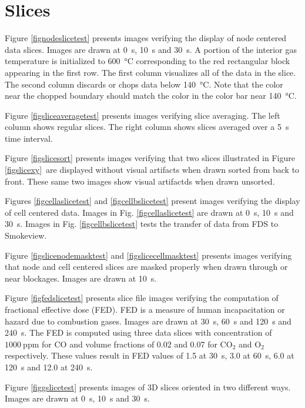 \documentclass[11pt,twoside]{book}
\begin{document}
\clearpage

\section{Slices}
Figure \ref{fignodeslicetest} presents images verifying the display of node centered data slices.
Images are drawn at \SI{0}{s}, \SI{10}{s} and \SI{30}{s}. A portion of the interior
gas temperature is initialized to \SI{600}{\degreeCelsius} corresponding to the
red rectangular block appearing in the first row. The first column visualizes
all of the data in the slice.  The second column discards or chops data below
\SI{140}{\degreeCelsius}. Note that the color near the chopped boundary should
match the color in the color bar near \SI{140}{\degreeCelsius}.

Figure \ref{figsliceaveragetest} presents images verifying slice averaging.  The left column shows regular slices.  The right column
shows slices averaged over a 5~s time interval.

Figure \ref{figslicesort} presents images verifying that two slices
illustrated in Figure \ref{figslicexy}\
are displayed without visual artifacts when drawn sorted from back to front.
These same two images show visual artifactds when drawn unsorted.

Figures \ref{figcellaslicetest} and \ref{figcellbslicetest} present images
verifying the display of cell centered data. Images in Fig. \ref{figcellaslicetest}
are drawn at \SI{0}{s}, \SI{10}{s} and \SI{30}{s}. Images in
Fig. \ref{figcellbslicetest} tests the transfer of data from FDS to Smokeview.

Figure \ref{figslicenodemasktest} and \ref{figslicecellmasktest} presents images verifying that node and cell centered slices
are masked properly when drawn through or near blockages. Images are drawn at \SI{10}{s}.

Figure \ref{figfedslicetest} presents slice file images verifying the computation
of fractional effective dose (FED).  FED is a measure of human incapacitation or
hazard due to combustion gases\cite{SFPE:Purser}. Images are drawn at \SI{30}{s},
\SI{60}{s} and \SI{120}{s} and \SI{240}{s}. The FED is computed using three data slices with concentration of $1000~\mathrm{ppm}$ for $\mathrm{CO}$ and volume fractions of 0.02 and 0.07 for $\mathrm{CO_2}$ and $\mathrm{O_2}$ respectively. These values result in FED values of 1.5 at \SI{30}{s}, 3.0 at \SI{60}{s}, 6.0 at \SI{120}{s} and 12.0 at \SI{240}{s}.

Figure \ref{figgslicetest} presents images of 3D slices oriented in two different
ways. Images are drawn at \SI{0}{s}, \SI{10}{s} and \SI{30}{s}.
\end{document}
